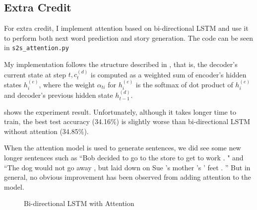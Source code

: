 \documentclass{article}
\begin{document}
\subsection{Extra Credit}
For extra credit, I implement attention based on bi-directional LSTM and use it to perform both next word prediction and story generation. The code can be seen in \texttt{s2s\_attention.py}

My implementation follows the structure described in \cite{nmt}, that is, the decoder's current state at step $t, c^{(d)}_t$ is computed as a weighted sum of encoder's hidden states $h^{(e)}_i$, where the weight $\alpha_{ti}$ for $h^{(e)}_i$ is the softmax of dot product of $h^{(e)}_i$ and decoder's previous hidden state $h^{(d)}_{t-1}$.

 shows the experiment result. Unfortunately, although it takes longer time to train, the best test accuracy (34.16\%)  is slightly worse than bi-directional LSTM without attention (34.85\%).  

When the attention model is used to generate sentences, we did see some new longer sentences such as ``Bob decided to go to the store to get to work . " and ``The dog would not go away , but laid down on Sue 's mother 's ' feet . '' But in general, no obvious improvement has been observed from adding attention to the model.

\begin{figure}
\centering
{}
\caption{Bi-directional LSTM with Attention}
\label{fig:attention}
\end{figure}



\end{document}
